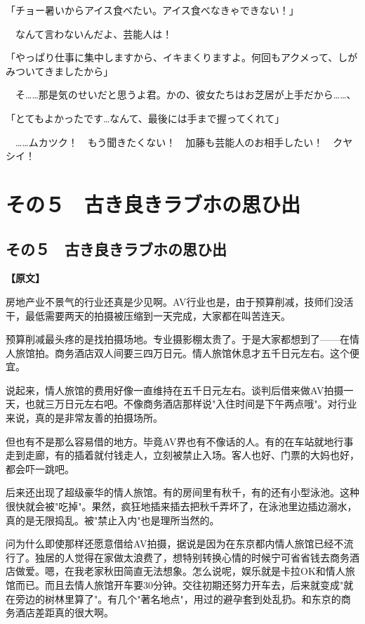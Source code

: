 \documentclass[12pt,UTF8]{ctexbook}
\begin{document}
{「チョー暑いからアイス食べたい。アイス食べなきゃできない！」

　なんて言わないんだよ、芸能人は！

「やっぱり仕事に集中しますから、イキまくりますよ。何回もアクメって、しがみついてきましたから」

　そ……那是気のせいだと思うよ君。かの、彼女たちはお芝居が上手だから……、

「とてもよかったです…なんて、最後には手まで握ってくれて」

　……ムカツク！　もう聞きたくない！　加藤も芸能人のお相手したい！　クヤシイ！

\chapter{その５　古き良きラブホの思ひ出}
\label{chap:05}

\section{その５　古き良きラブホの思ひ出}

\vspace{1ex}
\parbox{0.9\linewidth}{
\textbf{【原文】}\par

房地产业不景气的行业还真是少见啊。AV行业也是，由于预算削减，技师们没活干，最低需要两天的拍摄被压缩到一天完成，大家都在叫苦连天。

预算削减最头疼的是找拍摄场地。专业摄影棚太贵了。于是大家都想到了——在情人旅馆拍。商务酒店双人间要三四万日元。情人旅馆休息才五千日元左右。这个便宜。

说起来，情人旅馆的费用好像一直维持在五千日元左右。谈判后借来做AV拍摄一天，也就三万日元左右吧。不像商务酒店那样说"入住时间是下午两点哦"。对行业来说，真的是非常友善的拍摄场所。

但也有不是那么容易借的地方。毕竟AV界也有不像话的人。有的在车站就地行事走到走廊，有的插着就付钱走人，立刻被禁止入场。客人也好、门票的大妈也好，都会吓一跳吧。

后来还出现了超级豪华的情人旅馆。有的房间里有秋千，有的还有小型泳池。这种很快就会被"吃掉"。果然，疯狂地插来插去把秋千弄坏了，在泳池里边插边溺水，真的是无限捣乱。被"禁止入内"也是理所当然的。

问为什么即使那样还愿意借给AV拍摄，据说是因为在东京都内情人旅馆已经不流行了。独居的人觉得在家做太浪费了，想特别转换心情的时候宁可省省钱去商务酒店做爱。嗯，在我老家秋田简直无法想象。怎么说呢，娱乐就是卡拉OK和情人旅馆而已。而且去情人旅馆开车要30分钟。交往初期还努力开车去，后来就变成"就在旁边的树林里算了"。有几个"著名地点"，用过的避孕套到处乱扔。和东京的商务酒店差距真的很大啊。

}}
\end{document}

